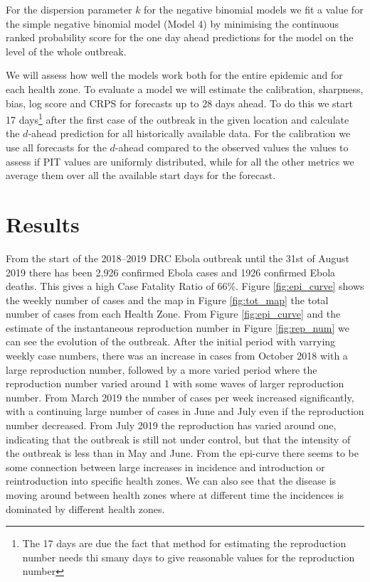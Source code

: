 \documentclass[12pt]{article}
\begin{document}
For the dispersion parameter $k$ for the negative binomial models we fit a value for the simple negative binomial model (Model 4) by minimising the continuous ranked probability score for the one day ahead predictions for the model on the level of the whole outbreak. 

We will assess how well the models work both for the entire epidemic and for each health zone. To evaluate a model we will estimate the calibration, sharpness, bias, log score and CRPS for forecasts up to 28 days ahead. To do this we start 17 days\footnote{The 17 days are due the fact that method for estimating the reproduction number needs thi smany days to give reasonable values for the reproduction number} after the first case of the outbreak in the given location and calculate the $d$-ahead prediction for all historically available data. For the calibration we use all forecasts for the $d$-ahead compared to the observed values the values to assess if PIT values are uniformly distributed, while for all the other metrics we average them over all the available start days for the forecast.



\section{Results}

From the start of the 2018--2019 DRC Ebola outbreak until the 31st of August 2019 there has been 2,926 confirmed Ebola cases and 1926 confirmed Ebola deaths. This gives a high Case Fatality Ratio of 66\%. Figure \ref{fig:epi_curve} shows the weekly number of cases and the map in Figure \ref{fig:tot_map} the total number of cases from each Health Zone. From Figure \ref{fig:epi_curve} and the estimate of the instantaneous reproduction number in Figure \ref{fig:rep_num} we can see the evolution of the outbreak. After the initial period with varrying weekly case numbers, there was an increase in cases from October 2018 with a large reproduction number, followed by a more varied period where the reproduction number varied around 1 with some waves of larger reproduction number. From March 2019 the number of cases per week increased significantly, with a continuing large number of cases in June and July even if the reproduction number decreased. From July 2019 the reproduction has varied around one, indicating that the outbreak is still not under control, but that the intensity of the outbreak is less than in May and June. From the epi-curve there seems to be some connection between large increases in incidence and introduction or reintroduction into specific health zones. We can also see that the disease is moving around between health zones where at different time the incidences is dominated by different health zones. 
\end{document}
